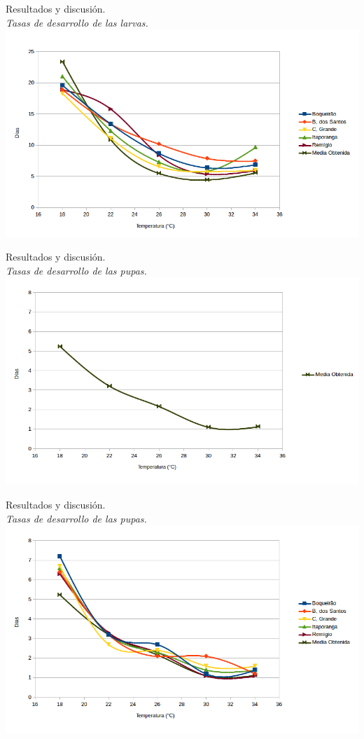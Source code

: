 \begin{frame}[t]{Resultados y discusión.\\\textit{Tasas de desarrollo de las larvas.}}
    \includegraphics[width=\textwidth]{./graphics/larvas-desarrollo.png}
\end{frame}

\begin{frame}[c]{Resultados y discusión.\\\textit{Tasas de desarrollo de las pupas.}}
    \includegraphics[width=\textwidth]{./graphics/pupas-desarrollo-single.png}
\end{frame}

\begin{frame}[c]{Resultados y discusión.\\\textit{Tasas de desarrollo de las pupas.}}
    \includegraphics[width=\textwidth]{./graphics/pupas-desarrollo.png}
\end{frame}

